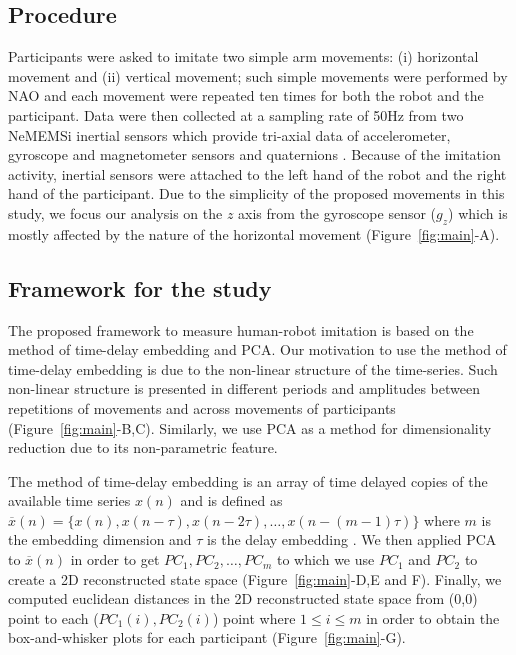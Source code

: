 \documentclass{sig-alternate-05-2015}
\begin{document}
\subsection{Procedure}
Participants were asked to imitate two simple arm movements: (i) 
horizontal movement and (ii) vertical movement;
such simple movements were performed by NAO and each movement were repeated ten times
for both the robot and the participant.
Data were then collected at a sampling rate of 50Hz from two NeMEMSi inertial sensors
which provide tri-axial data of accelerometer, gyroscope and magnetometer sensors and
quaternions \cite{Comotti2014}. Because of the imitation
activity, inertial sensors were attached to the left 
hand of the robot and the right hand of the participant.
Due to the simplicity of the proposed movements  in this study, 
we focus our analysis on the $z$ axis from the gyroscope sensor ($g_z$) 
which is mostly affected by the nature of the horizontal movement 
(Figure~\ref{fig:main}-A).


\subsection{Framework for the study}
The proposed framework to measure human-robot imitation
is based on the method of time-delay embedding and PCA.
Our motivation to use the method of time-delay embedding
is due to the non-linear structure of the time-series.
Such non-linear structure is presented in different periods and amplitudes 
between repetitions of movements and across movements of participants (Figure~\ref{fig:main}-B,C).
Similarly, we use PCA as a method for dimensionality reduction due to its non-parametric feature.



The method of time-delay embedding is an array of 
time delayed copies of the available time series $x(n)$ and is defined as  
$ \overline{x}(n) = \{  x(n), x(n-\tau), x(n-2\tau), \dots,x(n-(m-1)\tau)\}$
where $m$ is the embedding dimension and $\tau$ is the delay embedding \cite{Huke2006}.
We then applied PCA to $ \overline{x}(n)$ in order to get $PC_1, PC_2, \dots, PC_m$ 
to which we use $PC_1$ and $PC_2$ 
to create a 2D reconstructed state space (Figure~\ref{fig:main}-D,E and F).
Finally, we computed euclidean distances in the 2D reconstructed state space
from (0,0) point to each ($PC_1(i),PC_2(i)$) point where $1 \leq i \leq m$
in order to obtain the box-and-whisker plots for each participant (Figure~\ref{fig:main}-G).
\end{document}
